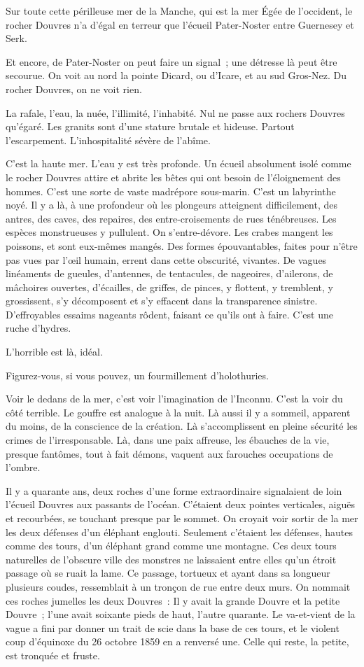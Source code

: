 \documentclass[french,twoside]{book} %
\begin{document}
Sur toute cette périlleuse mer de la Manche, qui  est la mer Égée de l’occident, le rocher Douvres n’a d’égal en terreur que l’écueil Pater-Noster entre Guernesey et Serk.\par
Et encore, de Pater-Noster on peut faire un signal ; une détresse là peut être secourue. On voit au nord la pointe Dicard, ou d’Icare, et au sud Gros-Nez. Du rocher Douvres, on ne voit rien.\par
La rafale, l’eau, la nuée, l’illimité, l’inhabité. Nul ne passe aux rochers Douvres qu’égaré. Les granits sont d’une stature brutale et hideuse. Partout l’escarpement. L’inhospitalité sévère de l’abîme.\par
C’est la haute mer. L’eau y est très profonde. Un écueil absolument isolé comme le rocher Douvres attire et abrite les bêtes qui ont besoin de l’éloignement des hommes. C’est une sorte de vaste madrépore sous-marin. C’est un labyrinthe noyé. Il y a là, à une profondeur où les plongeurs atteignent difficilement, des antres, des caves, des repaires, des entre-croisements de rues ténébreuses. Les espèces monstrueuses y pullulent. On s’entre-dévore. Les crabes mangent les poissons, et sont eux-mêmes mangés. Des formes épouvantables, faites pour n’être pas vues par l’œil humain, errent dans cette obscurité, vivantes. De vagues linéaments de gueules, d’antennes, de tentacules, de nageoires, d’ailerons, de mâchoires ouvertes, d’écailles, de griffes, de pinces, y flottent, y tremblent, y grossissent, s’y décomposent et s’y effacent dans la transparence sinistre. D’effroyables essaims nageants rôdent, faisant ce qu’ils ont à faire. C’est une ruche d’hydres.\par
 L’horrible est là, idéal.\par
Figurez-vous, si vous pouvez, un fourmillement d’holothuries.\par
Voir le dedans de la mer, c’est voir l’imagination de l’Inconnu. C’est la voir du côté terrible. Le gouffre est analogue à la nuit. Là aussi il y a sommeil, apparent du moins, de la conscience de la création. Là s’accomplissent en pleine sécurité les crimes de l’irresponsable. Là, dans une paix affreuse, les ébauches de la vie, presque fantômes, tout à fait démons, vaquent aux farouches occupations de l’ombre.\par
Il y a quarante ans, deux roches d’une forme extraordinaire signalaient de loin l’écueil Douvres aux passants de l’océan. C’étaient deux pointes verticales, aiguës et recourbées, se touchant presque par le sommet. On croyait voir sortir de la mer les deux défenses d’un éléphant englouti. Seulement c’étaient les défenses, hautes comme des tours, d’un éléphant grand comme une montagne. Ces deux tours naturelles de l’obscure ville des monstres ne laissaient entre elles qu’un étroit passage où se ruait la lame. Ce passage, tortueux et ayant dans sa longueur plusieurs coudes, ressemblait à un tronçon de rue entre deux murs. On nommait ces roches jumelles les deux Douvres : Il y avait la grande Douvre et la petite Douvre ; l’une avait soixante pieds de haut, l’autre quarante. Le va-et-vient de la vague a fini par donner un trait de scie dans la base de ces tours, et le violent coup d’équinoxe du 26 octobre 1859 en a renversé une. Celle qui reste, la petite, est tronquée et fruste.\par
\end{document}
